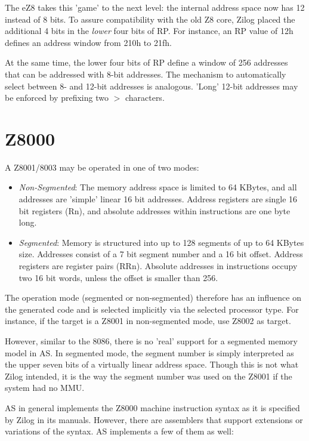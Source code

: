 \documentclass[12pt,twoside]{report}
\newcommand{\asname}{{AS}}
\begin{document}
The eZ8 takes this 'game' to the next level: the internal address
space now has 12 instead of 8 bits.  To assure compatibility with the
old Z8 core, Zilog placed the additional 4 bits in the {\em lower}
four bits of RP.  For instance, an RP value of 12h defines an address
window from 210h to 21fh.

At the same time, the lower four bits of RP define a window of 256
addresses that can be addressed with 8-bit addresses.  The mechanism
to automatically select between 8- and 12-bit addresses is analogous.
'Long' 12-bit addresses may be enforced by prefixing two $>$
characters.


\section{Z8000}
\label{Z8000Spec}

A Z8001/8003 may be operated in one of two modes:

\begin{itemize}
\item{{\em Non-Segmented}: The memory address space is limited to 64 KBytes,
      and all addresses are 'simple' linear 16 bit addresses.  Address
      registers are single 16 bit registers (Rn), and absolute addresses
      within instructions are one byte long.}
\item{{\em Segmented}: Memory is structured into up to 128 segments of up
      to 64 KBytes size.  Addresses consist of a 7 bit segment number and a
      16 bit offset. Address registers are register pairs (RRn).  Absolute
      addresses in instructions occupy two 16 bit words, unless the offset
      is smaller than 256.}
\end{itemize}

The operation mode (segmented or non-segmented) therefore has an influence
on the generated code and is selected implicitly via the selected processor
type.  For instance, if the target is a Z8001 in non-segmented mode, use
Z8002 as target.

However, similar to the 8086, there is no 'real' support for a segmented
memory model in \asname{}. In segmented mode, the segment number is simply interpreted
as the upper seven bits of a virtually linear address space.  Though this is
not what Zilog intended, it is the way the segment number was used on the
Z8001 if the system had no MMU.

\asname{} in general implements the Z8000 machine instruction syntax as it is specified
by Zilog in its manuals.  However, there are assemblers that support extensions
or variations of the syntax.  \asname{} implements a few of them as well:
\end{document}
